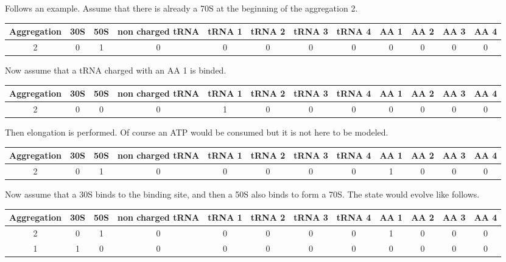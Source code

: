 Follows an example. Assume that there is already a 70S at the beginning of the aggregation 2.
\begin{center}
  \tiny
  \begin{tabular}{|c|c|c|c|c|c|c|c|c|c|c|c|}
    \hline
    Aggregation & 30S & 50S & non charged tRNA & tRNA 1 & tRNA 2 & tRNA 3 & tRNA 4 & AA 1 & AA 2 & AA 3 & AA 4 \\
    \hline
         2      &  0 & 1 & 0 & 0 & 0 & 0 & 0 & 0 & 0 & 0 & 0 \\
    \hline
  \end{tabular}
\end{center}
Now assume that a tRNA charged with an AA 1 is binded.
\begin{center}
  \tiny
  \begin{tabular}{|c|c|c|c|c|c|c|c|c|c|c|c|}
    \hline
    Aggregation & 30S & 50S & non charged tRNA & tRNA 1 & tRNA 2 & tRNA 3 & tRNA 4 & AA 1 & AA 2 & AA 3 & AA 4 \\
    \hline
         2      &  0 & 0 & 0 & 1 & 0 & 0 & 0 & 0 & 0 & 0 & 0 \\
    \hline
  \end{tabular}
\end{center}
Then elongation is performed. Of course an ATP would be consumed but it is not here to be modeled.
\begin{center}
  \tiny
  \begin{tabular}{|c|c|c|c|c|c|c|c|c|c|c|c|}
    \hline
    Aggregation & 30S & 50S & non charged tRNA & tRNA 1 & tRNA 2 & tRNA 3 & tRNA 4 & AA 1 & AA 2 & AA 3 & AA 4 \\
    \hline
         2      &  0 & 1 & 0 & 0 & 0 & 0 & 0 & 1 & 0 & 0 & 0 \\
    \hline
  \end{tabular}
\end{center}
Now assume that a 30S binds to the binding site, and then a 50S also binds to form a 70S. The state would evolve like follows.
\begin{center}
  \tiny
  \begin{tabular}{|c|c|c|c|c|c|c|c|c|c|c|c|}
    \hline
    Aggregation & 30S & 50S & non charged tRNA & tRNA 1 & tRNA 2 & tRNA 3 & tRNA 4 & AA 1 & AA 2 & AA 3 & AA 4 \\
    \hline
         2      &  0 & 1 & 0 & 0 & 0 & 0 & 0 & 1 & 0 & 0 & 0 \\
         1      &  1 & 0 & 0 & 0 & 0 & 0 & 0 & 0 & 0 & 0 & 0 \\
    \hline
  \end{tabular}
\end{center}
